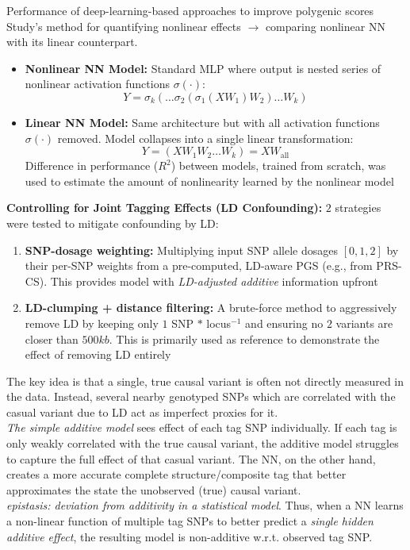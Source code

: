 \documentclass[twocolumn]{article}
\begin{document}
\begin{literaturepaper}{Performance of deep-learning-based approaches to improve polygenic scores \cite{Kelemen2025PolygenicScores}}
Study's method for quantifying nonlinear effects $\rightarrow$ comparing nonlinear NN with its linear counterpart.
\begin{itemize}
    \item \textbf{Nonlinear NN Model:} Standard MLP where output is  nested series of nonlinear activation functions $\sigma(\cdot)$:
    \[ Y = \sigma_k(\dots\sigma_2(\sigma_1(XW_1)W_2)\dots W_k) \]
    \item \textbf{Linear NN Model:} Same architecture but with all activation functions $\sigma(\cdot)$ removed. Model collapses into a single linear transformation:
    \[ Y = (XW_1W_2\dots W_k) = XW_{\text{all}} \]
    Difference in performance ($R^2$) between models, trained from scratch, was used to estimate the amount of nonlinearity learned by the nonlinear model
\end{itemize}

\textbf{Controlling for Joint Tagging Effects (LD Confounding):}
$2$ strategies were tested to mitigate confounding by LD:
\begin{enumerate}
    \item \textbf{SNP-dosage weighting:} Multiplying input SNP allele dosages $[0,1,2]$ by their per-SNP weights from a pre-computed, LD-aware PGS (e.g., from PRS-CS). This provides model with \textit{LD-adjusted additive} information upfront
    \item \textbf{LD-clumping + distance filtering:} A brute-force method to aggressively remove LD by keeping only $1$ SNP $*$ locus$^{-1}$ and ensuring no $2$ variants are closer than $500kb$. This is primarily used as reference to demonstrate the effect of removing LD entirely
\end{enumerate}

The key idea is that a single, true causal variant is often not directly measured in the data. Instead, several nearby genotyped SNPs which are correlated with the casual variant due to LD act as imperfect proxies for it.\\

\textit{The simple additive model} sees effect of each tag SNP individually. If each tag is only weakly correlated with the true causal variant, the additive model struggles to capture the full effect of that casual variant. The NN, on the other hand, creates a more accurate complete structure/composite tag that better approximates the state the unobserved (true) causal variant. \\

\textit{epistasis: deviation from additivity in a statistical model}. Thus, when a NN learns a non-linear function of multiple tag SNPs to better predict a \textit{single hidden additive effect}, the resulting model is non-additive w.r.t. observed tag SNP.



\end{literaturepaper}
\end{document}
